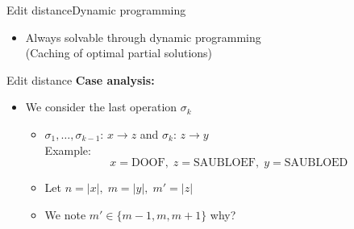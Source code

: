 \begin{frame}{Edit distance}{Dynamic programming}
\begin{itemize}
\begin{itemize}
          \begin{figure}[!h]
          \end{figure}
      \end{itemize}
    \item<10->
      Always solvable through dynamic programming\\
      (Caching of optimal partial solutions)
  \end{itemize}
\end{frame}


\begin{frame}{Edit distance}
  \textbf{Case analysis:}
  \begin{itemize}
    \item<2->
      We consider the last operation $\sigma_k$
      \begin{itemize}
        \item<3->
          $\sigma_1, \dots, \sigma_{k-1}$:
          {\color{Mittel-Blau}$x \rightarrow z$} and $\sigma_k$:
          {\color{Mittel-Blau}$z \rightarrow y$}\\
          Example:
          \begin{displaymath}
            x = \mathrm{DOOF}, \;
            z = \mathrm{SAUBLOEF}, \;
            y = \mathrm{SAUBLOED}
          \end{displaymath}
        \item<4->
          Let $n = \vert x \vert, \; m = \vert y \vert, \; m' = \vert z \vert$
        \item<5->
          We note $m' \in \{m - 1, m, m + 1\}$
          \hspace{1.5em}
          {\color{gray}why?}
      \end{itemize}
  \end{itemize}
\end{frame}

